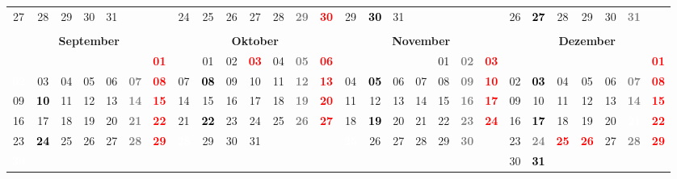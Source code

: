 \documentclass[10pt,a4paper,landscape]{article}
\newcommand{\bb}[1]{\cellcolor{MidnightBlue}\textcolor{white}{\bf #1}}
\newcommand{\yb}[1]{\cellcolor{yellow}\textcolor{black}{\bf #1}}
\newcommand{\rb}[1]{\textbf{\textcolor{red}{#1}}}
\newcommand{\hv}[1]{\textbf{\textcolor{Gray}{#1}}}
\begin{document}
\begin{tabular}{|ccccccc|ccccccc|ccccccc|ccccccc|}
27 & 28 & 29 & 30 & 31 & & & 24 & 25 & 26 & 27 & 28 & \hv{29} & \rb{30} & 29 & \yb{30} & 31 & & & & & 26 & \yb{27} & 28 & 29 & 30 & \hv{31} &  \\
& & & & & & & & & & & & & & & & & & & & & & & & & & &  \\
\hline
\multicolumn{7}{|c|}{\bf September} & \multicolumn{7}{|c|}{\bf Oktober} & \multicolumn{7}{|c|}{\bf November} & \multicolumn{7}{|c|}{\bf Dezember} \\
& & & & & & \rb{01} & & 01 & 02 & \rb{03} & 04 & \hv{05} & \rb{06} & & & & & 01 & \hv{02} & \rb{03} & & & & & & & \rb{01} \\
\bb{02} & 03 & 04 & 05 & 06 & \hv{07} & \rb{08} & 07 & \yb{08} & 09 & 10 & 11 & \hv{12} & \rb{13} & 04 & \yb{05} & 06 & 07 & 08 & \hv{09} & \rb{10} & 02 & \yb{03} & 04 & 05 & 06 & \hv{07} & \rb{08} \\
09 & \yb{10} & 11 & 12 & 13 & \hv{14} & \rb{15} & 14 & 15 & 16 & 17 & 18 & \hv{19} & \rb{20} & 11 & 12 & 13 & 14 & 15 & \hv{16} & \rb{17} & 09 & 10 & 11 & 12 & 13 & \hv{14} & \rb{15} \\
16 & 17 & 18 & 19 & 20 & \hv{21} & \rb{22} & 21 & \yb{22} & 23 & 24 & 25 & \hv{26} & \rb{27} & 18 & \yb{19} & 20 & 21 & 22 & \hv{23} & \rb{24} & 16 & \yb{17} & 18 & 19 & 20 & \bb{21} & \rb{22} \\
23 & \yb{24} & 25 & 26 & 27 & \hv{28} & \rb{29} & \bb{28} & 29 & 30 & 31 & & & & \bb{25} & 26 & 27 & 28 & 29 & \hv{30} & & 23 & \hv{24} & \rb{25} & \rb{26} & 27 & \hv{28} & \rb{29} \\
\bb{30} & & & & & & & & & & & & & & & & & & & & & 30 & \yb{31} & & & & &  \\
\hline
\end{tabular}
\end{document}
